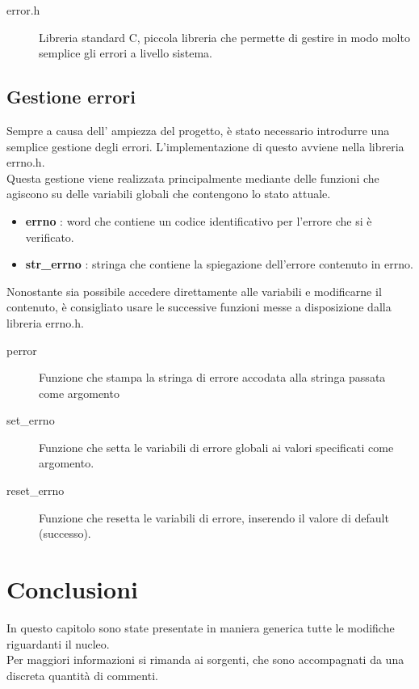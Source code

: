   \begin{description}
    \item[error.h]
    Libreria standard C, piccola libreria che permette di gestire in modo molto semplice gli errori a livello sistema.
  \end{description}
  
 \subsection{Gestione errori}
    Sempre a causa dell' ampiezza del progetto, è stato necessario introdurre una semplice gestione degli errori. L'implementazione di questo 
    avviene nella libreria errno.h. \\
    Questa gestione viene realizzata principalmente mediante delle funzioni che agiscono su delle variabili globali che contengono lo stato attuale.  
     \begin{itemize}
      \item \textbf{errno} : word che contiene un codice identificativo per l'errore che si è verificato. 
     \end{itemize}
     
    \begin{itemize}
     \item \textbf{str\_errno} : stringa che contiene la spiegazione dell'errore contenuto in errno. 
    \end{itemize}

    Nonostante sia possibile accedere direttamente alle variabili e modificarne il contenuto, è consigliato usare le successive funzioni messe a disposizione dalla libreria errno.h. 
    
      \begin{description}
       \item[perror]
	    Funzione che stampa la stringa di errore accodata alla stringa passata come argomento
       \end{description}

  \begin{description}
   \item[set\_errno] 
	    Funzione che setta le variabili di errore globali ai valori specificati come argomento.
   \end{description}
    
   \begin{description}
    \item[reset\_errno]
	Funzione che resetta le variabili di errore, inserendo il valore di default (successo).  
   \end{description}

    \section{Conclusioni}
      In questo capitolo sono state presentate in maniera generica tutte le modifiche riguardanti il nucleo. \\
      Per maggiori informazioni si rimanda ai sorgenti, che sono accompagnati da una discreta quantità di commenti. \\
\clearpage{\pagestyle{empty}\cleardoublepage}